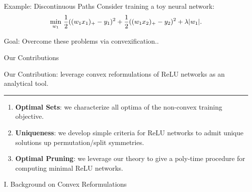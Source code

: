 \documentclass[usenames,dvipsnames,mathserif,notheorems]{beamer}
\newcommand{\horizontalrule}{
	{
			\vspace{-0.5em}
			\center \rule{\textwidth}{0.1em}
			\vspace{-0.2em}
		}
}
\newcommand{\good}[1]{\textcolor{good}{#1}}
\begin{document}
\begin{frame}{Example: Discontinuous Paths}
	Consider training a toy neural network:
	\[
		\min_{w_1} \, \frac 1 2 ((w_1 x_1)_+ - y_1)^2 + \frac 1 2 ((w_1 x_2)_+ - y_2)^2 + \lambda |w_1|.
	\]

	\begin{center}
		
	\end{center}

	\pause

	\begin{center}
		\Large
		\good{Goal}: Overcome these problems via convexification..
	\end{center}

\end{frame}

\begin{frame}{Our Contributions}

	{
		\large \good{Our Contribution}: leverage convex reformulations
		of ReLU networks \citep{pilanci2020convex} as an analytical tool.
	}

	\pause
	\vspace{0.5em}
	\horizontalrule
	\vspace{0.5em}

	\begin{enumerate}
		\item \textbf{Optimal Sets}: we characterize all optima of the
		      non-convex training objective.\pause
		      \vspace{0.5em}

		\item \textbf{Uniqueness}: we develop simple criteria for ReLU networks
		      to admit unique solutions up permutation/split symmetries. \pause
		      \vspace{0.5em}

		\item \textbf{Optimal Pruning}: we leverage our theory to give a
		      poly-time procedure for computing minimal ReLU networks.
	\end{enumerate}

\end{frame}


\begin{frame}{}
	\begin{center}
		\huge I. Background on Convex Reformulations
	\end{center}
\end{frame}
\end{document}
